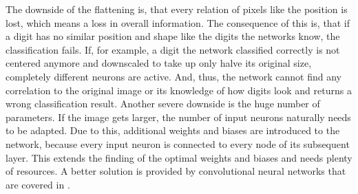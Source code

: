 The downside of the flattening is, that every relation of pixels like the position is lost, which means a loss in overall information.
The consequence of this is, that if a digit has no similar position and shape like the digits the networks know, the classification fails.
If, for example, a digit the network classified correctly is not centered anymore and downscaled to take up only halve its original size, completely different neurons are active.
And, thus, the network cannot find any correlation to the original image or its knowledge of how digits look and returns a wrong classification result.
Another severe downside is the huge number of parameters.
If the image gets larger, the number of input neurons naturally needs to be adapted.
Due to this, additional weights and biases are introduced to the network, because every input neuron is connected to every node of its subsequent layer.
This extends the finding of the optimal weights and biases and needs plenty of resources.
A better solution is provided by convolutional neural networks that are covered in .
